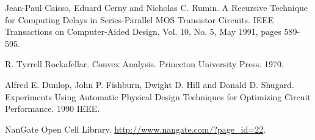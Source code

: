 \documentclass{fmetfm}
\begin{document}
\begin{thebibliography}{9}
Jean-Paul Caisso, Eduard Cerny and Nicholas C. Rumin. A Recursive Technique for Computing Delays in Series-Parallel MOS Transistor Circuits. IEEE Transactions on Computer-Aided Design, Vol. 10, No. 5, May 1991, pages 589-595.

R. Tyrrell Rockafellar. Convex Analysis. Princeton University Press. 1970.

Alfred E. Dunlop, John P. Fishburn, Dwight D. Hill and Donald D. Shugard. Experiments Using Automatic Physical Design Techniques for Optimizing Circuit Performance. 1990 IEEE.

NanGate Open Cell Library. \url{http://www.nangate.com/?page_id=22}.
\end{thebibliography}

%
\end{document}
